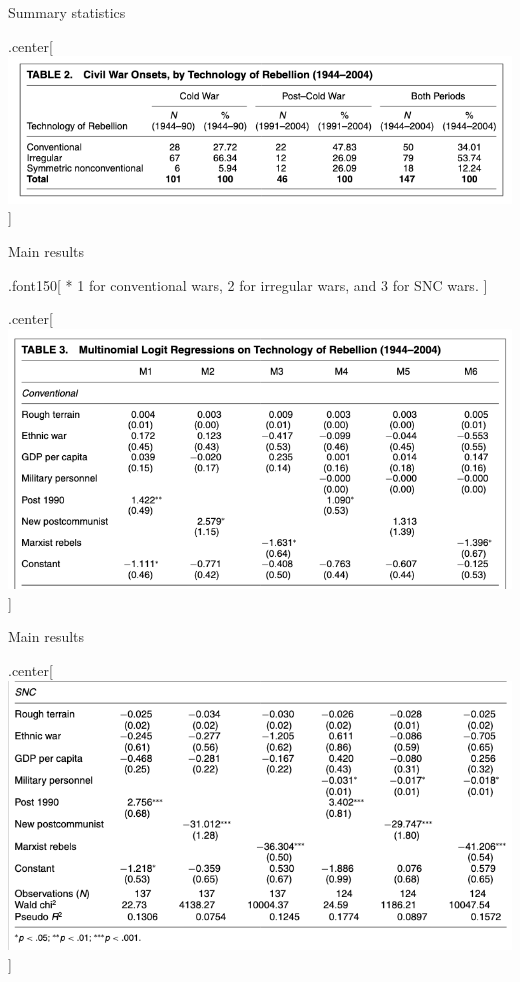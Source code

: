 \documentclass[ignorenonframetext,]{beamer}
\begin{document}
\begin{frame}{Summary statistics}

\begin{block}{.center{[}\includegraphics{kb02.png}{]}}

\end{block}

\end{frame}

\begin{frame}{Main results}

.font150{[} * 1 for conventional wars, 2 for irregular wars, and 3 for
SNC wars. {]}

\begin{block}{.center{[}\includegraphics{kb03.png}{]}}

\end{block}

\end{frame}

\begin{frame}{Main results}

\begin{block}{.center{[}\includegraphics{kb04.png}{]}}

\end{block}

\end{frame}
\end{document}
